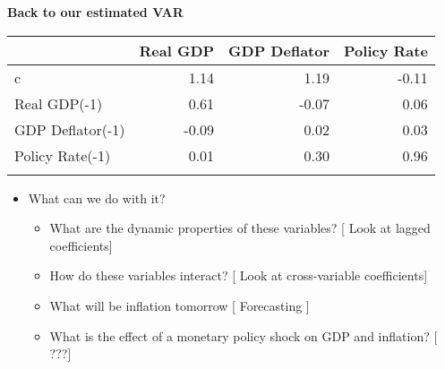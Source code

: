 \documentclass[10pt,handout]{beamer}
\begin{document}
\vspace{.1cm}

\begin{frame}
{\textbf{Back to our estimated VAR}} 
\begin{table}[tbph]
{\footnotesize \centering%
\begin{tabular}{lrrr}
\addlinespace\toprule & Real GDP & GDP Deflator & Policy Rate \\ 
\midrule c & 1.14 & 1.19 & -0.11 \\ 
Real GDP(-1) & 0.61 & -0.07 & 0.06 \\ 
GDP Deflator(-1) & -0.09 & 0.02 & 0.03 \\ 
Policy Rate(-1) & 0.01 & 0.30 & 0.96 \\ 
\bottomrule &  &  & 
\end{tabular}%
}
\end{table}

\begin{itemize}
\item What can we do with it?\smallskip

\begin{itemize}
\item What are the dynamic properties of these variables? [{{\color{red}
Look at lagged coefficients}}]\smallskip \pause

\item How do these variables interact? [{{\color{red} Look at cross-variable
coefficients}}]\smallskip \pause

\item What will be inflation tomorrow [{{\color{red} Forecasting}}%
]\smallskip \pause

\item What is the effect of a monetary policy shock on GDP and inflation? [{{%
\color{red} ???}}]
\end{itemize}
\end{itemize}
\end{frame}

\vspace{.1cm}
\end{document}
